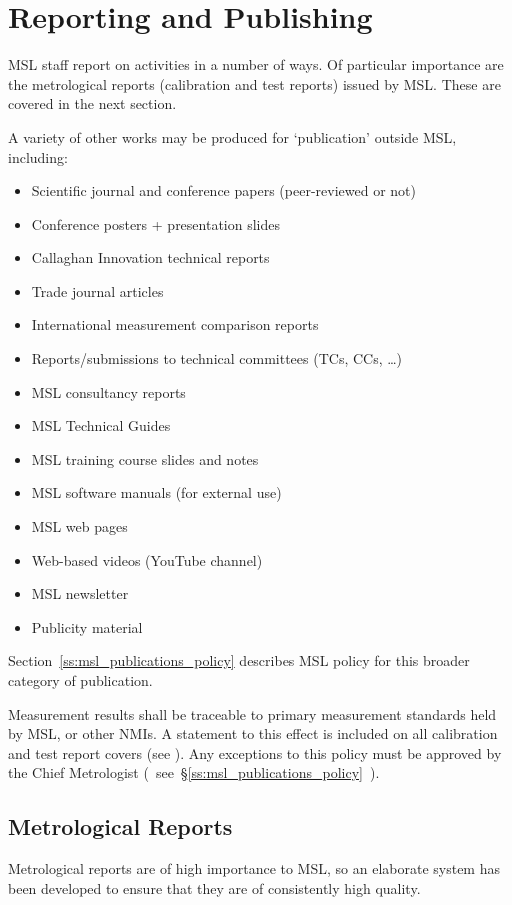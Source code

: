 \section{Reporting and Publishing}
MSL staff report on activities in a number of ways. Of particular importance are the metrological reports (calibration and test reports) issued by MSL. These are covered in the next section. 

A variety of other works may be produced for ‘publication' outside MSL, including:
\begin{itemize}
\item Scientific journal and conference papers (peer-reviewed or not)
\item Conference posters + presentation slides
\item Callaghan Innovation technical reports
\item Trade journal articles
\item International measurement comparison reports
\item Reports/submissions to technical committees (TCs, CCs, …)
\item MSL consultancy reports
\item MSL Technical Guides
\item MSL training course slides and notes
\item MSL software manuals (for external use)
\item MSL web pages
\item Web-based videos (YouTube channel)   
\item MSL newsletter
\item Publicity material
\end{itemize}

Section~\ref{ss:msl_publications_policy} describes MSL policy for this broader category of publication.

Measurement results shall be traceable to primary measurement standards held by MSL, or other NMIs. A statement to this effect is included on all calibration and test report covers (see \cite{MSL_Reporting_Guidelines}). Any exceptions to this policy must be approved by the Chief Metrologist (~see~\S\ref{ss:msl_publications_policy}~).

\subsection{Metrological Reports}
\label{ss:metrological_reports}
Metrological reports are of high importance to MSL, so an elaborate system has been developed to ensure that they are of consistently high quality.

